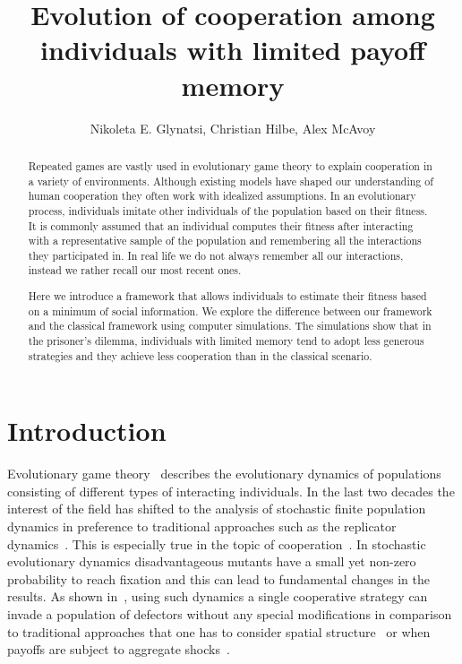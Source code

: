\documentclass[11pt]{article}
\title{\bf  \sffamily \LARGE Evolution of cooperation among individuals with
limited payoff memory\\}
\date{}
\author{Nikoleta E. Glynatsi, Christian Hilbe, Alex McAvoy}
\theoremstyle{plainCl1}
\theoremstyle{plainCl2}
\begin{document}
\maketitle

\begin{abstract}
Repeated games are vastly used in evolutionary game theory to explain cooperation
in a variety of environments. Although existing models have shaped our
understanding of human cooperation they often work with idealized assumptions.
In an evolutionary process, individuals imitate other individuals of the
population based on their fitness. It is commonly assumed that an individual
computes their fitness after interacting with a representative sample of the
population and remembering all the interactions they participated in. In real
life we do not always remember all our interactions, instead we rather recall
our most recent ones.

Here we introduce a framework that allows individuals to estimate their fitness
based on a minimum of social information. We explore the difference between our
framework and the classical framework using computer simulations. The
simulations show that in the prisoner's dilemma, individuals with limited memory
tend to adopt less generous strategies and they achieve less cooperation than in
the classical scenario.
\end{abstract}

\section{Introduction}

Evolutionary game theory~\cite{smith1982evolution, hofbauer1998evolutionary,
nowak:Nature:2004, hauert2005game} describes the evolutionary dynamics of
populations consisting of different types of interacting individuals. In the
last two decades the interest of the field has shifted to the analysis of
stochastic finite population dynamics in preference to traditional approaches
such as the replicator dynamics~\cite{hofbauer:JTB:1979, taylor:MATHBIO:1978}.
This is especially true in the topic of cooperation~\cite{hilbe:PNAS:2013,
hilbe:Nature:2018,glynatsi:SCR:2020}. In stochastic evolutionary dynamics
disadvantageous mutants have a small yet non-zero probability to reach fixation
and this can lead to fundamental changes in the results. As shown
in~\cite{nowak:Nature:2004}, using such dynamics a single cooperative strategy
can invade a population of defectors without any special modifications in
comparison to traditional approaches that one has to consider spatial
structure~\cite{nowak:Nature:1992} or when payoffs are subject to aggregate
shocks~\cite{fudenberg:JET:1992}.
\end{document}

